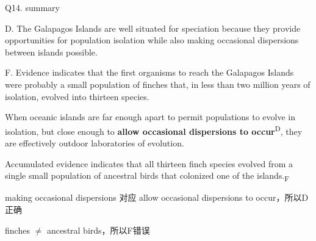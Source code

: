 \begin{blk}
    \begin{qst}
        Q14. summary
    \end{qst}

    \begin{chc}
        D. The Galapagos Islands are well situated for speciation because they provide opportunities for population isolation while also making occasional dispersions between islands possible.

        F. Evidence indicates that the first organisms to reach the Galapagos Islands were probably a small population of finches that, in less than two million years of isolation, evolved into thirteen species.
    \end{chc}

    \begin{psgq}
        When oceanic islands are far enough apart to permit populations to evolve in isolation, but close enough to \textbf{allow occasional dispersions to occur}\textsuperscript{D}, they are effectively outdoor laboratories of evolution.

        Accumulated evidence indicates that all thirteen finch species evolved from a single small population of ancestral birds that colonized one of the islands.\textsubscript{F}
    \end{psgq}

    \begin{nlz}
        making occasional dispersions 对应 allow occasional dispersions to occur，所以D正确

        finches $\neq $ ancestral birds，所以F错误
    \end{nlz}
\end{blk}
